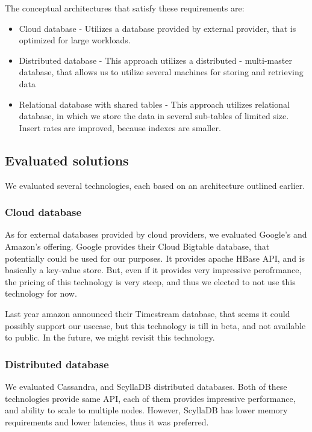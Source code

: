 The conceptual architectures that satisfy these requirements are:
\begin{itemize}
    \item{Cloud database} - Utilizes a database provided by external provider, that is optimized
    for large workloads.
    \item{Distributed database} - This approach utilizes a distributed - multi-master database,
    that allows us to utilize several machines for storing and retrieving data

    \item{Relational database with shared tables} - This approach utilizes relational database, in which
    we store the data in several sub-tables of limited size. Insert rates are improved, because indexes
    are smaller.
\end{itemize}

\subsection{Evaluated solutions}
We evaluated several technologies, each based on an architecture outlined earlier.
\subsubsection{Cloud database}
As for external databases provided by cloud providers, we evaluated Google's and Amazon's offering.
Google provides their Cloud Bigtable database, that potentially could be used for our purposes. It provides
apache HBase API, and is basically a key-value store. But, even if it provides very impressive perofrmance,
the pricing of this technology is very steep, and thus we elected to not use this technology for now.

Last year amazon announced their Timestream database, that seems it could possibly support our usecase, but this
technology is till in beta, and not available to public. In the future, we might revisit this technology.

\subsubsection{Distributed database}
We evaluated Cassandra, and ScyllaDB distributed databases. Both of these technologies
provide same API, each of them provides impressive performance, and ability to scale to multiple nodes.
However, ScyllaDB has lower memory requirements and lower latencies, thus it was preferred.

